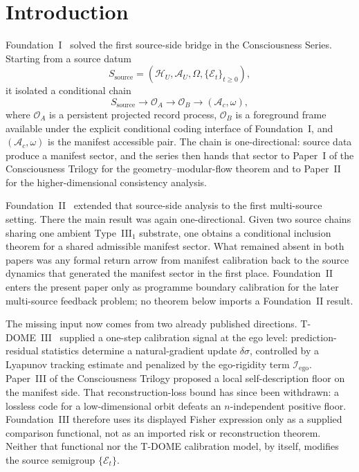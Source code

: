 \documentclass[12pt]{article}
\theoremstyle{definition}
\theoremstyle{remark}
\begin{document}
\clearpage
\tableofcontents
\clearpage

\section{Introduction}\label{sec:intro}

Foundation~I~\cite{FoundationI} solved the first source-side bridge in
the Consciousness Series. Starting from a source datum
\[
S_{\mathrm{source}}
=
(\mathcal H_U,\mathcal A_U,\Omega,\{\mathcal E_t\}_{t\ge 0}),
\]
it isolated a conditional chain
\[
S_{\mathrm{source}}
\to
\mathcal O_A
\to
\mathcal O_B
\to
(\mathcal A_c,\omega),
\]
where \(\mathcal O_A\) is a persistent projected record process,
\(\mathcal O_B\) is a foreground frame available under the explicit
conditional coding interface of Foundation~I, and
\((\mathcal A_c,\omega)\) is the manifest accessible pair. The chain is
one-directional: source data produce a manifest sector, and the series
then hands that sector to Paper~I of the Consciousness Trilogy
\cite{PaperI} for the geometry--modular-flow theorem and to
Paper~II~\cite{PaperII} for the higher-dimensional consistency analysis.

Foundation~II~\cite{FoundationII} extended that source-side analysis to
the first multi-source setting. There the main result was again
one-directional. Given two source chains sharing one ambient
Type~III\(_1\) substrate, one obtains a conditional inclusion theorem
for a shared admissible manifest sector. What remained absent in both
papers was any formal return arrow from manifest calibration back to the
source dynamics that generated the manifest sector in the first place.
Foundation~II enters the present paper only as programme boundary
calibration for the later multi-source feedback problem; no theorem
below imports a Foundation~II result.

The missing input now comes from two already published directions.
T-DOME~III~\cite{TDOMEIII} supplied a one-step calibration signal at the
ego level: prediction-residual statistics determine a natural-gradient
update \(\delta\sigma\), controlled by a Lyapunov tracking estimate and
penalized by the ego-rigidity term
\(\mathcal I_{\mathrm{ego}}\). Paper~III of the Consciousness Trilogy
\cite{PaperIII} proposed a local self-description floor on the manifest
side. That reconstruction-loss bound has since been withdrawn: a
lossless code for a low-dimensional orbit defeats an
\(n\)-independent positive floor. Foundation~III therefore uses its
displayed Fisher expression only as a supplied comparison functional,
not as an imported risk or reconstruction theorem. Neither that
functional nor the T-DOME calibration model, by itself, modifies the
source semigroup \(\{\mathcal E_t\}\).
\end{document}
